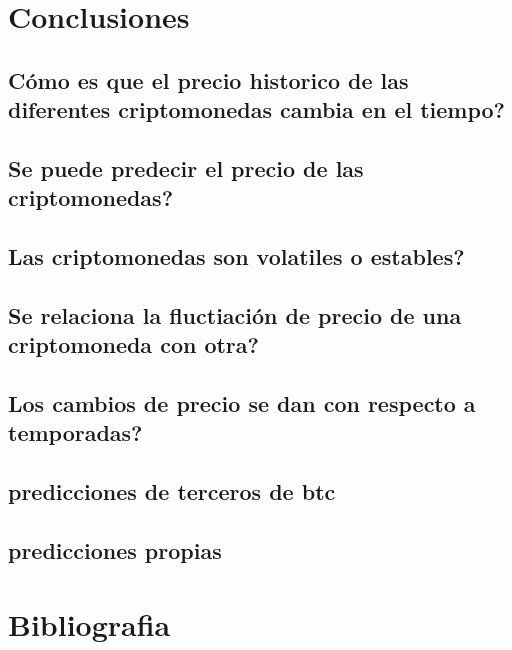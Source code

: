 \documentclass[12pt,letterpaper]{article}
\begin{document}
\section*{Conclusiones}

	\subsection*{C\'omo es que el precio historico de las diferentes criptomonedas cambia en el tiempo?}
	\subsection*{Se puede predecir el precio de las criptomonedas?}
	\subsection*{Las criptomonedas son volatiles o estables?}
	\subsection*{Se relaciona la fluctiaci\'on de precio de una criptomoneda con otra?}
	\subsection*{Los cambios de precio se dan con respecto a temporadas?}
	\subsection*{predicciones de terceros de btc}
	\subsection*{predicciones propias}
	
\section{Bibliografia}
\end{document}
